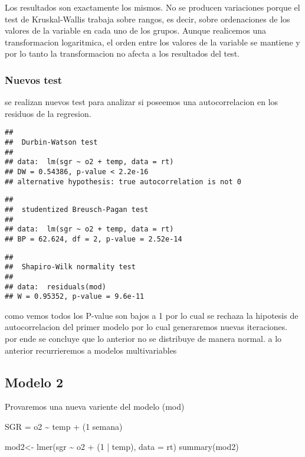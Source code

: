 \documentclass[
]{article}
\newenvironment{Shaded}{\begin{snugshade}}{\end{snugshade}}
\newcommand{\AttributeTok}[1]{\textcolor[rgb]{0.77,0.63,0.00}{#1}}
\newcommand{\DecValTok}[1]{\textcolor[rgb]{0.00,0.00,0.81}{#1}}
\newcommand{\FunctionTok}[1]{\textcolor[rgb]{0.00,0.00,0.00}{#1}}
\newcommand{\NormalTok}[1]{#1}
\newcommand{\OtherTok}[1]{\textcolor[rgb]{0.56,0.35,0.01}{#1}}
\newcommand{\SpecialCharTok}[1]{\textcolor[rgb]{0.00,0.00,0.00}{#1}}
\begin{document}
Los resultados son exactamente los mismos. No se producen variaciones
porque el test de Kruskal-Wallis trabaja sobre rangos, es decir, sobre
ordenaciones de los valores de la variable en cada uno de los grupos.
Aunque realicemos una transformacion logaritmica, el orden entre los
valores de la variable se mantiene y por lo tanto la transformacion no
afecta a los resultados del test.

\hypertarget{nuevos-test}{%
\subsubsection{Nuevos test}\label{nuevos-test}}

se realizan nuevos test para analizar si poseemos una autocorrelacion en
los residuos de la regresion.

\begin{verbatim}
## 
##  Durbin-Watson test
## 
## data:  lm(sgr ~ o2 + temp, data = rt)
## DW = 0.54386, p-value < 2.2e-16
## alternative hypothesis: true autocorrelation is not 0
\end{verbatim}

\begin{verbatim}
## 
##  studentized Breusch-Pagan test
## 
## data:  lm(sgr ~ o2 + temp, data = rt)
## BP = 62.624, df = 2, p-value = 2.52e-14
\end{verbatim}

\begin{verbatim}
## 
##  Shapiro-Wilk normality test
## 
## data:  residuals(mod)
## W = 0.95352, p-value = 9.6e-11
\end{verbatim}

como vemos todos los P-value son bajos a 1 por lo cual se rechaza la
hipotesis de autocorrelacion del primer modelo por lo cual generaremos
nuevas iteraciones. por ende se concluye que lo anterior no se
distribuye de manera normal. a lo anterior recurrieremos a modelos
multivariables

\hypertarget{modelo-2}{%
\subsection{Modelo 2}\label{modelo-2}}

Provaremos una nueva variente del modelo (mod)

SGR = o2 \textasciitilde{} temp + (1\textbar{} semana)

\begin{Shaded}
\begin{Highlighting}[]
\NormalTok{mod2}\OtherTok{\textless{}{-}} \FunctionTok{lmer}\NormalTok{(sgr }\SpecialCharTok{\textasciitilde{}}\NormalTok{ o2 }\SpecialCharTok{+}\NormalTok{ (}\DecValTok{1} \SpecialCharTok{|}\NormalTok{ temp), }\AttributeTok{data =}\NormalTok{ rt)}
\FunctionTok{summary}\NormalTok{(mod2)}
\end{Highlighting}
\end{Shaded}
\end{document}
